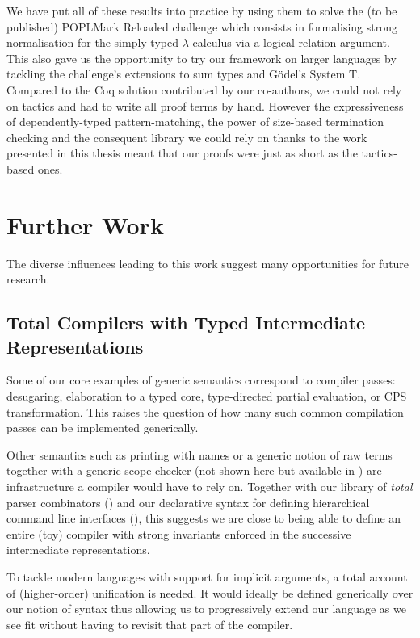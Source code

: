 We have put all of these results into practice by using them to solve the (to be
published) POPLMark Reloaded challenge which consists in formalising strong
normalisation for the simply typed $\lambda$-calculus via a logical-relation
argument. This also gave us the opportunity to try our framework on larger
languages by tackling the challenge's extensions to sum types and G\"{o}del's
System T. Compared to the Coq solution contributed by our co-authors, we could
not rely on tactics and had to write all proof terms by hand. However the
expressiveness of dependently-typed pattern-matching, the power of size-based
termination checking and the consequent library we could rely on thanks to the
work presented in this thesis meant that our proofs were just as short as
the tactics-based ones.

\section{Further Work}

The diverse influences leading to this work suggest many opportunities
for future research.

\subsection{Total Compilers with Typed Intermediate Representations}

Some of our core examples of generic semantics correspond to compiler passes:
desugaring, elaboration to a typed core, type-directed partial evaluation,
or CPS transformation. This raises the question of how many such common
compilation passes can be implemented generically.

Other semantics such as printing with names or a generic notion of raw terms
together with a generic scope checker (not shown here but available in \cite{repo2018})
are infrastructure a compiler would have to rely on. Together with our library of
\emph{total} parser combinators (\cite{allais2018agdarsec}) and our declarative
syntax for defining hierarchical command line interfaces (\cite{allaisagdargs}),
this suggests we are close to being able to define an entire (toy) compiler with
strong invariants enforced in the successive intermediate representations.

To tackle modern languages with support for implicit arguments, a total account of
(higher-order) unification is needed. It would ideally be defined generically over
our notion of syntax thus allowing us to progressively extend our language as we
see fit without having to revisit that part of the compiler.

